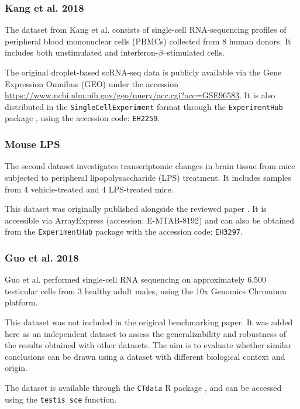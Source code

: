 \documentclass[a4paper, 11pt, twocolumn]{article}
\begin{document}
\begin{multicols}{2}
\subsubsection{Kang et al. 2018}

The dataset from Kang et al. \citep{kang_multiplexed_2018} consists of single-cell RNA-sequencing profiles of peripheral blood mononuclear cells (PBMCs) collected from 8 human donors. It includes both unstimulated and interferon-$\beta$–stimulated cells.

The original droplet-based scRNA-seq data is publicly available via the Gene Expression Omnibus (GEO) under the accession \url{https://www.ncbi.nlm.nih.gov/geo/query/acc.cgi?acc=GSE96583}. It is also distributed in the \texttt{SingleCellExperiment} format \citep{sce} through the \texttt{ExperimentHub} package \citep{ExperimentHub}, using the accession code: \texttt{EH2259}.

\subsubsection{Mouse LPS}

The second dataset investigates transcriptomic changes in brain tissue from mice subjected to peripheral lipopolysaccharide (LPS) treatment. It includes samples from 4 vehicle-treated and 4 LPS-treated mice.

This dataset was originally published alongside the reviewed paper \citep{crowell2020muscat}. It is accessible via ArrayExpress (accession: E-MTAB-8192) and can also be obtained from the \texttt{ExperimentHub} package \citep{ExperimentHub} with the accession code: \texttt{EH3297}.

\subsubsection{Guo et al. 2018}

Guo et al. \citep{guo_adult_2018} performed single-cell RNA sequencing on approximately 6,500 testicular cells from 3 healthy adult males, using the 10x Genomics Chromium platform.

This dataset was not included in the original benchmarking paper. It was added here as an independent dataset to assess the generalizability and robustness of the results obtained with other datasets. The aim is to evaluate whether similar conclusions can be drawn using a dataset with different biological context and origin.

The dataset is available through the \texttt{CTdata} R package \citep{CTdata}, and can be accessed using the \texttt{testis\_sce} function.



\end{multicols}
\end{document}
